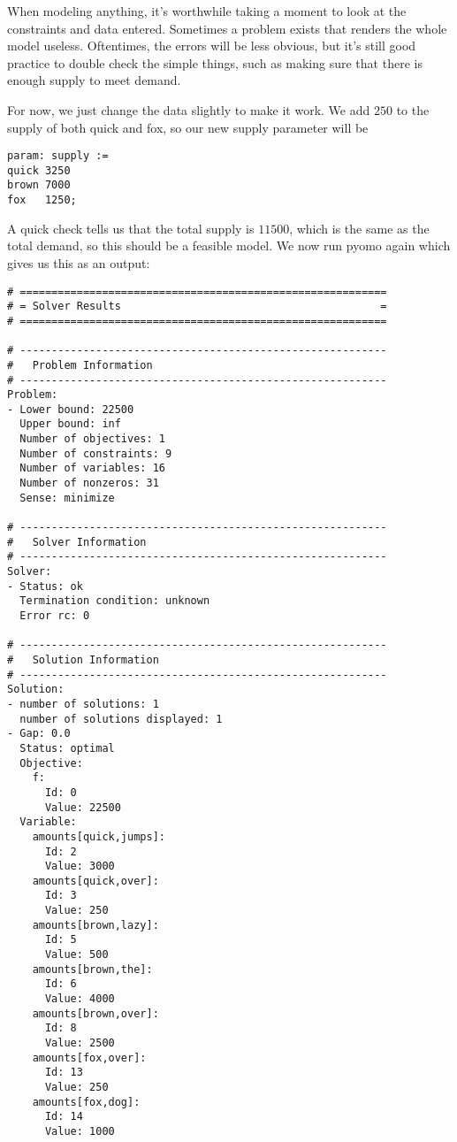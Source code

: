 \documentclass{article}
\begin{document}
When modeling anything, it's worthwhile taking a moment to look at the constraints and data entered.  Sometimes a problem exists that renders the whole model useless.  Oftentimes, the errors will be less obvious, but it's still good practice to double check the simple things, such as making sure that there is enough supply to meet demand.

For now, we just change the data slightly to make it work.  We add $250$ to the supply of both quick and fox, so our new supply parameter will be 

\begin{verbatim}
param: supply :=
quick 3250
brown 7000
fox   1250;
\end{verbatim}

A quick check tells us that the total supply is $11500$, which is the same as the total demand, so this should be a feasible model.  We now run pyomo again which gives us this as an output:

\begin{verbatim}
# ==========================================================
# = Solver Results                                         =
# ==========================================================

# ----------------------------------------------------------
#   Problem Information
# ----------------------------------------------------------
Problem: 
- Lower bound: 22500
  Upper bound: inf
  Number of objectives: 1
  Number of constraints: 9
  Number of variables: 16
  Number of nonzeros: 31
  Sense: minimize

# ----------------------------------------------------------
#   Solver Information
# ----------------------------------------------------------
Solver: 
- Status: ok
  Termination condition: unknown
  Error rc: 0

# ----------------------------------------------------------
#   Solution Information
# ----------------------------------------------------------
Solution: 
- number of solutions: 1
  number of solutions displayed: 1
- Gap: 0.0
  Status: optimal
  Objective: 
    f: 
      Id: 0
      Value: 22500
  Variable: 
    amounts[quick,jumps]: 
      Id: 2
      Value: 3000
    amounts[quick,over]: 
      Id: 3
      Value: 250
    amounts[brown,lazy]: 
      Id: 5
      Value: 500
    amounts[brown,the]: 
      Id: 6
      Value: 4000
    amounts[brown,over]: 
      Id: 8
      Value: 2500
    amounts[fox,over]: 
      Id: 13
      Value: 250
    amounts[fox,dog]: 
      Id: 14
      Value: 1000
\end{verbatim}
\end{document}
